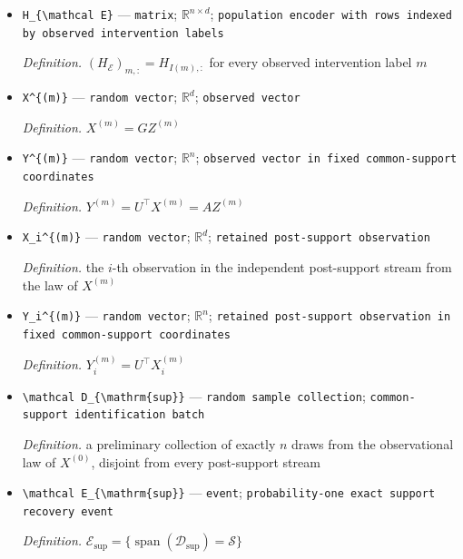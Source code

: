 \documentclass{article}
\begin{document}
\begin{itemize}
  \item \texttt{H\_\allowbreak{}\{\textbackslash{}\allowbreak{}mathcal E\}\allowbreak{}} --- \texttt{matrix}; \(\mathbb R^{n\times d}\); \texttt{population encoder with rows indexed by observed intervention labels}
  \par\smallskip\noindent\emph{Definition.} \((H_{\mathcal E})_{m,:}=H_{I(m),:}\) for every observed intervention label \(m\)
  \item \texttt{X\textasciicircum{}\{(m)\}\allowbreak{}} --- \texttt{random vector}; \(\mathbb R^d\); \texttt{observed vector}
  \par\smallskip\noindent\emph{Definition.} \(X^{(m)}=GZ^{(m)}\)
  \item \texttt{Y\textasciicircum{}\{(m)\}\allowbreak{}} --- \texttt{random vector}; \(\mathbb R^n\); \texttt{observed vector in fixed common-\allowbreak{}support coordinates}
  \par\smallskip\noindent\emph{Definition.} \(Y^{(m)}=U^{\top}X^{(m)}=AZ^{(m)}\)
  \item \texttt{X\_\allowbreak{}i\textasciicircum{}\{(m)\}\allowbreak{}} --- \texttt{random vector}; \(\mathbb R^d\); \texttt{retained post-\allowbreak{}support observation}
  \par\smallskip\noindent\emph{Definition.} the \(i\)-th observation in the independent post-support stream from the law of \(X^{(m)}\)
  \item \texttt{Y\_\allowbreak{}i\textasciicircum{}\{(m)\}\allowbreak{}} --- \texttt{random vector}; \(\mathbb R^n\); \texttt{retained post-\allowbreak{}support observation in fixed common-\allowbreak{}support coordinates}
  \par\smallskip\noindent\emph{Definition.} \(Y_i^{(m)}=U^{\top}X_i^{(m)}\)
  \item \texttt{\textbackslash{}\allowbreak{}mathcal D\_\allowbreak{}\{\textbackslash{}\allowbreak{}mathrm\{sup\}\allowbreak{}\}\allowbreak{}} --- \texttt{random sample collection}; \texttt{common-\allowbreak{}support identification batch}
  \par\smallskip\noindent\emph{Definition.} a preliminary collection of exactly \(n\) draws from the observational law of \(X^{(0)}\), disjoint from every post-support stream
  \item \texttt{\textbackslash{}\allowbreak{}mathcal E\_\allowbreak{}\{\textbackslash{}\allowbreak{}mathrm\{sup\}\allowbreak{}\}\allowbreak{}} --- \texttt{event}; \texttt{probability-\allowbreak{}one exact support recovery event}
  \par\smallskip\noindent\emph{Definition.} \(\mathcal E_{\mathrm{sup}}=\{\operatorname{span}(\mathcal D_{\mathrm{sup}})=\mathcal S\}\)

\end{itemize}
\end{document}
